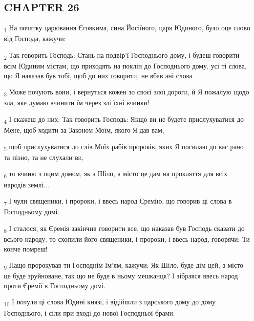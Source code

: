 \subsection{CHAPTER 26}
\begin{tcolorbox}
\textsubscript{1} На початку царювання Єгоякима, сина Йосіїного, царя Юдиного, було оце слово від Господа, кажучи:
\end{tcolorbox}
\begin{tcolorbox}
\textsubscript{2} Так говорить Господь: Стань на подвір'ї Господнього дому, і будеш говорити всім Юдиним містам, що приходять на поклін до Господнього дому, усі ті слова, що Я наказав був тобі, щоб до них говорити, не вбав ані слова.
\end{tcolorbox}
\begin{tcolorbox}
\textsubscript{3} Може почують вони, і вернуться кожен зо своєї злої дороги, й Я пожалую щодо зла, яке думаю вчинити їм через злі їхні вчинки!
\end{tcolorbox}
\begin{tcolorbox}
\textsubscript{4} І скажеш до них: Так говорить Господь: Якщо ви не будете прислухуватися до Мене, щоб ходити за Законом Моїм, якого Я дав вам,
\end{tcolorbox}
\begin{tcolorbox}
\textsubscript{5} щоб прислухуватися до слів Моїх рабів пророків, яких Я посилаю до вас рано та пізно, та не слухали ви,
\end{tcolorbox}
\begin{tcolorbox}
\textsubscript{6} то вчиню з оцим домом, як з Шіло, а місто це дам на прокляття для всіх народів землі...
\end{tcolorbox}
\begin{tcolorbox}
\textsubscript{7} І чули священики, і пророки, і ввесь народ Єремію, що говорив ці слова в Господньому домі.
\end{tcolorbox}
\begin{tcolorbox}
\textsubscript{8} І сталося, як Єремія закінчив говорити все, що наказав був Господь сказати до всього народу, то схопили його священики, і пророки, і ввесь народ, говорячи: Ти конче помреш!
\end{tcolorbox}
\begin{tcolorbox}
\textsubscript{9} Нащо пророкував ти Господнім Ім'ям, кажучи: Як Шіло, буде дім цей, а місто це буде зруйноване, так що не буде в ньому мешканця? І зібрався ввесь народ проти Єремії в Господньому домі.
\end{tcolorbox}
\begin{tcolorbox}
\textsubscript{10} І почули ці слова Юдині князі, і відійшли з царського дому до дому Господнього, і сіли при вході до нової Господньої брами.
\end{tcolorbox}
